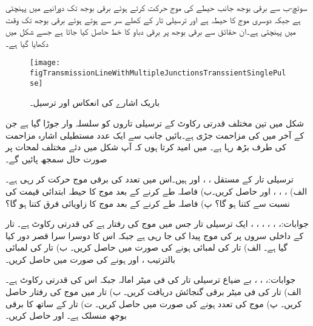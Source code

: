 سوئچ-ب سے برقی بوجھ جانب  حیطے کی موج حرکت کرتے ہوئے برقی بوجھ تک  دورانیے میں پہنچتی ہے جبکہ دوسری موج کا حیطہ  ہے اور ترسیلی تار کے کھلے سر سے ہوتے ہوئے برقی بوجھ تک  وقت میں پہنچتی ہے۔ان حقائق سے برقی بوجھ پر برقی دباو کا خط حاصل کیا جاتا ہے جسے شکل  میں دکھایا گیا ہے۔

\begin{figure}
\centering
\texttt{[image: figTransmissionLineWithMultipleJunctionsTranssientSinglePulse]}
\caption{باریک اشارے کی انعکاس اور ترسیل۔}
\label{شکل_ترسیلی_تار_باریک_اشارے_کی_انعکاس}
\end{figure}

شکل  میں تین مختلف قدرتی رکاوٹ کے ترسیلی تاروں کو سلسلہ وار جوڑا گیا ہے جن کے آخر میں  کی مزاحمت جڑی ہے۔بائیں جانب سے ایک عدد مستطیلی اشارہ مزاحمت کی طرف بڑھ رہا ہے۔ میں امید کرتا ہوں کہ آپ شکل میں دئے مختلف لمحات پر صورت حال سمجھ پائیں گے۔
\newpage
{}

ترسیلی تار کے مستقل ، ،  اور  ہیں۔اس میں  تعدد کی برقی موج حرکت کر رہی ہے۔ الف) ، ، ،  اور  حاصل کریں۔ب)   فاصلہ طے کرنے کے بعد موج کا حیطہ ابتدائی قیمت کی نسبت سے کتنا ہو گا؟ پ)  فاصلہ طے کرنے کے بعد موج کا زاویائی فرق کتنا ہو گا؟ 

جوابات:، ، ، ، ، ، 
ایک ترسیلی تار جس میں موج کی رفتار  ہے کی قدرتی رکاوٹ  ہے۔ تار کے داخلی سروں پر  کی موج پیدا کی جا رہی ہے جبکہ اس کا دوسرا سرا قصر دور کیا گیا ہے۔ الف) تار کی لمبائی  ہونے کی صورت میں  حاصل کریں۔ ب) تار کی لمبائی بالترتیب ،  اور  ہونے کی صورت میں  حاصل کریں۔

جوابات:، ، ،  
بے ضیاع ترسیلی تار کی فی میٹر امالہ  جبکہ اس کی قدرتی رکاوٹ  ہے۔الف) تار کی فی میٹر برقی گنجائش دریافت کریں۔ ب) تار میں موج کی رفتار حاصل کریں۔ پ) موج کی تعدد  ہونے کی صورت میں  حاصل کریں۔ ت) تار کے ساتھ  کا برقی بوجھ منسلک ہے۔  اور  حاصل کریں۔

